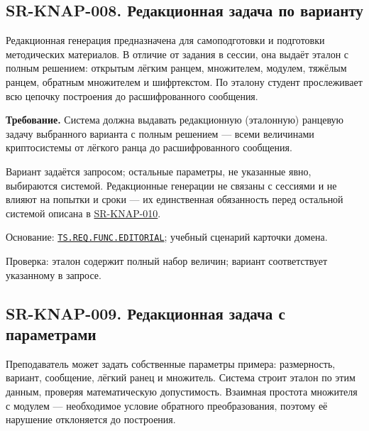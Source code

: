 \documentclass[12pt,a4paper]{article}
\begin{document}
\subsection{SR-KNAP-008. Редакционная задача по варианту}\label{sr-knap-008-ux440ux435ux434ux430ux43aux446ux438ux43eux43dux43dux430ux44f-ux437ux430ux434ux430ux447ux430-ux43fux43e-ux432ux430ux440ux438ux430ux43dux442ux443}

\hypertarget{sr-knap-008-редакционная-задача-по-варианту}{}

\hypertarget{sr-knap-008}{}

Редакционная генерация предназначена для самоподготовки и подготовки методических материалов. В отличие от задания в сессии, она выдаёт эталон с полным решением: открытым лёгким ранцем, множителем, модулем, тяжёлым ранцем, обратным множителем и шифртекстом. По эталону студент прослеживает всю цепочку построения до расшифрованного сообщения.

\textbf{Требование.} Система должна выдавать редакционную (эталонную) ранцевую задачу выбранного варианта с полным решением --- всеми величинами криптосистемы от лёгкого ранца до расшифрованного сообщения.

Вариант задаётся запросом; остальные параметры, не указанные явно, выбираются системой. Редакционные генерации не связаны с сессиями и не влияют на попытки и сроки --- их единственная обязанность перед остальной системой описана в {\hyperlink{sr-knap-010}{SR-KNAP-010}}.

Основание: {\href{../02\_Техническое\_задание/DOC-02\_Техническое\_задание.pdf\#ts-req-func-editorial}{\texttt{TS.\allowbreak{}REQ.\allowbreak{}FUNC.\allowbreak{}EDITORIAL}}}; учебный сценарий карточки домена.

Проверка: эталон содержит полный набор величин; вариант соответствует указанному в запросе.

\subsection{SR-KNAP-009. Редакционная задача с параметрами}\label{sr-knap-009-ux440ux435ux434ux430ux43aux446ux438ux43eux43dux43dux430ux44f-ux437ux430ux434ux430ux447ux430-ux441-ux43fux430ux440ux430ux43cux435ux442ux440ux430ux43cux438}

\hypertarget{sr-knap-009-редакционная-задача-с-параметрами}{}

\hypertarget{sr-knap-009}{}

Преподаватель может задать собственные параметры примера: размерность, вариант, сообщение, лёгкий ранец и множитель. Система строит эталон по этим данным, проверяя математическую допустимость. Взаимная простота множителя с модулем --- необходимое условие обратного преобразования, поэтому её нарушение отклоняется до построения.
\end{document}
